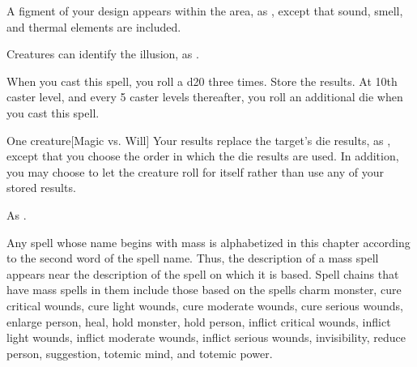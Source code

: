 \begin{spellheader}
    \spelldur{\durshort}
\end{spellheader}
\begin{spelleffects}
    \spelleffect A figment of your design appears within the area, as , except that sound, smell, and thermal elements are included.
\end{spelleffects}
\begin{spellfooter}
    \spellnotes Creatures can identify the illusion, as .
\end{spellfooter}

\begin{spellheader}
    \spellrng{\rngmed}
    \spellspecial When you cast this spell, you roll a d20 three times. Store the results. At 10th caster level, and every 5 caster levels thereafter, you roll an additional die when you cast this spell.
\end{spellheader}
\begin{spelleffects}
    \begin{spelltarget}{One creature}[Magic vs. Will]
        \spellsuccess Your results replace the target's die results, as , except that you choose the order in which the die results are used. In addition, you may choose to let the creature roll for itself rather than use any of your stored results.
    \end{spelltarget}
\end{spelleffects}
\begin{spellfooter}
    \spellnotes As .

    \par Any spell whose name begins with mass is alphabetized in this chapter according to the second word of the spell name. Thus, the description of a mass spell appears near the description of the spell on which it is based. Spell chains that have mass spells in them include those based on the spells charm monster, cure critical wounds, cure light wounds, cure moderate wounds, cure serious wounds, enlarge person, heal, hold monster, hold person, inflict critical wounds, inflict light wounds, inflict moderate wounds, inflict serious wounds, invisibility, reduce person, suggestion, totemic mind, and totemic power.
\end{spellfooter}

